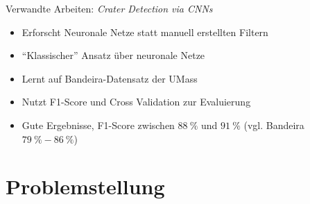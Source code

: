 \documentclass[9pt]{beamer}
\begin{document}
\begin{frame}{Verwandte Arbeiten: \textit{Crater Detection via CNNs}\footnotemark[1]}
\begin{itemize}
	\item Erforscht Neuronale Netze statt manuell erstellten Filtern
	\item \enquote{Klassischer} Ansatz über neuronale Netze
	\item Lernt auf Bandeira-Datensatz der UMass
	\item Nutzt F1-Score und Cross Validation zur Evaluierung
	\item Gute Ergebnisse, F1-Score zwischen $\SI{88}{\percent}$ und $\SI{91}{\percent}$ (vgl. Bandeira $\SI{79}{\percent}-\SI{86}{\percent}$)
\end{itemize}
\end{frame}

\section{Problemstellung}
\end{document}
